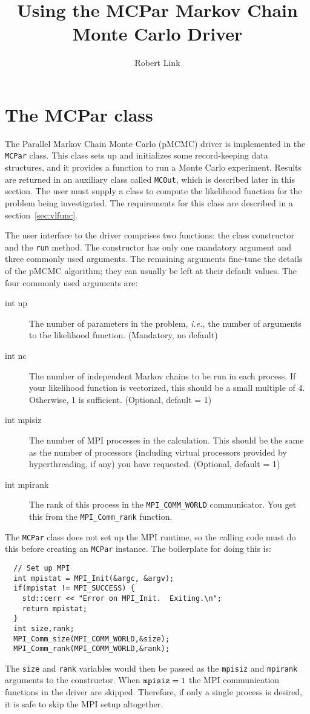 \documentclass[11pt]{article}
\title{Using the MCPar Markov Chain Monte Carlo Driver}
\author{Robert Link}
\begin{document}
\maketitle

\section{The {MCPar} class}
\label{sec:mcpar}

The Parallel Markov Chain Monte Carlo (pMCMC) driver is implemented in
the \texttt{MCPar} class.  This class sets up and initializes some
record-keeping data structures, and it provides a function to run a
Monte Carlo experiment.  Results are returned in an auxiliary class
called \texttt{MCOut}, which is described later in this section.  The
user must supply a class to compute the likelihood function for the
problem being investigated.  The requirements for this class are
described in a section~\ref{sec:vlfunc}.

The user interface to the driver comprises two functions: the class
constructor and the \texttt{run} method.  The constructor has only one
mandatory argument and three commonly used arguments.  The remaining
arguments fine-tune the details of the pMCMC algorithm; they can
usually be left at their default values.  The four commonly used
arguments are:
\begin{description}
\item[int np] The number of parameters in the problem, \emph{i.e.,} the
  number of arguments to the likelihood function.  (Mandatory, no
  default)
\item[int nc] The number of independent Markov chains to be run in each
  process.  If your likelihood function is vectorized, this should be
  a small multiple of 4.  Otherwise, 1 is sufficient. (Optional,
  default = 1)
\item[int mpisiz] The number of MPI processes in the calculation.  This
  should be the same as the number of processors (including virtual
  processors provided by hyperthreading, if any) you have
  requested. (Optional, default = 1)
\item[int mpirank] The rank of this process in the \verb=MPI_COMM_WORLD=
  communicator.  You get this from the \verb=MPI_Comm_rank= function.
\end{description}

The \texttt{MCPar} class does not set up the MPI runtime, so the
calling code must do this before creating an \texttt{MCPar} instance.
The boilerplate for doing this is:
\begin{verbatim}
  // Set up MPI
  int mpistat = MPI_Init(&argc, &argv);
  if(mpistat != MPI_SUCCESS) {
    std::cerr << "Error on MPI_Init.  Exiting.\n";
    return mpistat;
  }
  int size,rank;
  MPI_Comm_size(MPI_COMM_WORLD,&size);
  MPI_Comm_rank(MPI_COMM_WORLD,&rank);
\end{verbatim}
The \texttt{size} and \texttt{rank} variables would then be passed as
the \texttt{mpisiz} and \texttt{mpirank} arguments to the constructor.
When $\mbox{\texttt{mpisiz}} = 1$ the MPI communication functions in
the driver are skipped.  Therefore, if only a single process is
desired, it is safe to skip the MPI setup altogether.
\end{document}
